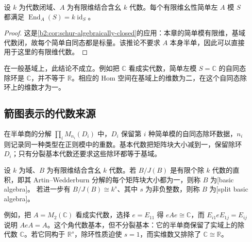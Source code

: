 \begin{proposition}\label{b2:prop:split-simple-endomorphisms}
	设 \(k\) 为代数闭域、\(A\) 为有限维结合含幺 \(k\) 代数。每个有限维幺性简单左 \(A\) 模 \(S\) 都满足 \(\operatorname{End}_A(S)=k\operatorname{id}_S\)。
\end{proposition}
\begin{proof}
	这是\cref{b2:cor:schur-algebraically-closed}的应用：本章的简单模有限维，基域代数闭，故每个简单自同态都是标量。该推论不要求 \(A\) 本身半单，因此可以直接用于这里的有限维代数。
\end{proof}

在一般基域上，此结论不成立。例如把 \(\mathbb C\) 看成实代数，简单左模 \(S=\mathbb C\) 的自同态除环是 \(\mathbb C\)，并不等于 \(\mathbb R\)。相应的 Hom 空间在基域上的维数为二，在这个自同态除环上的维数才为一。

\subsection{箭图表示的代数来源}
\label{b2:subsec:1504:03}

在半单商的分解 \(\prod_iM_{n_i}(D_i)\) 中，\(D_i\) 保留第 \(i\) 种简单模的自同态除环数据，\(n_i\) 则记录同一种类型在正则模中的重数。基本代数把矩阵块大小减到一，保留除环 \(D_i\)；只有分裂基本代数还要求这些除环都等于基域。

\begin{definition}\label{b2:def:basic-algebra}
	设 \(k\) 为域、\(B\) 为有限维结合含幺 \(k\) 代数。若 \(B/J(B)\) 是有限个除 \(k\) 代数的直积，即其 Artin--Wedderburn 分解的每个矩阵块大小都为一，则称 \(B\) 为[basic algebra]。 若进一步有 \(B/J(B)\cong k^s\)、其中 \(s\) 为非负整数，则称 \(B\) 为[split basic algebra]。
\end{definition}

例如，把 \(A=M_2(\mathbb C)\) 看成实代数，选择 \(e=E_{11}\) 得 \(eAe\cong\mathbb C\)，而 \(E_{i1}eE_{1j}=E_{ij}\) 说明 \(AeA=A\)。这个角代数基本，但不分裂基本：它的半单商保留了实域上的除代数 \(\mathbb C\)。若它同构于 \(\mathbb R^s\)，除环性质迫使 \(s=1\)，而实维数又排除了 \(\mathbb C\cong\mathbb R\)。

